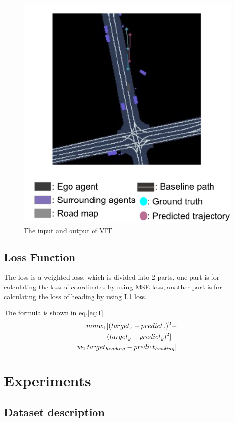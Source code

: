 \documentclass[10pt,conference,compsocconf]{IEEEtran}
\begin{document}
\begin{figure}[!ht]
	\centering
	\includegraphics[width=0.9\linewidth]{VITIO2.png}
	\caption{The input and output of VIT}
    \label{fig:VITIO}
\end{figure}
\subsection{Loss Function}
The loss is a weighted loss, which is divided into 2 parts, one part is for calculating the loss of coordinates by using MSE loss, another part is for calculating the loss of heading by using L1 loss.

The formula is shown in eq.\ref{eq:1}
\begin{equation}
    \begin{align}
        min\space w_1[(target_x-predict_x)^2+
        \\(target_y-predict_y)^2]+
        \\
        w_2|target_{heading}-predict_{heading}|
    \end{align}
    \label{eq:1}
\end{equation}
\section{Experiments}
\subsection{Dataset description}
\end{document}
